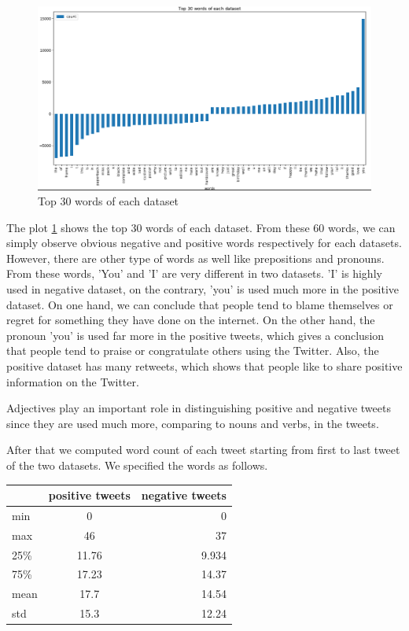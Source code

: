 \documentclass[10pt,conference,compsocconf]{IEEEtran}
\begin{document}
\begin{tiny}
	\begin{figure}[b] \label{fig4}
		\includegraphics[scale=0.35]{Lkhamaa2.png}   
		\caption{Top 30 words of each dataset }
		\label{fig4}    
	\end{figure}
\end{tiny}

The plot \ref{fig4} shows the top 30 words of each dataset. From these 60 words, we can simply observe obvious negative and positive words respectively for each datasets. However, there are other type of words as well like prepositions and pronouns. From these words, 'You' and 'I' are very different in two datasets. 'I' is highly used in negative dataset, on the contrary, 'you' is used much more in the positive dataset. On one hand, we can conclude that people tend to blame themselves or regret for something they have done on the internet. On the other hand, the pronoun 'you' is used far more in the positive tweets, which gives a conclusion that people tend to praise or congratulate others using the Twitter. Also, the positive dataset has many retweets, which shows that people like to share positive information on the Twitter.

Adjectives play an important role in distinguishing positive and negative tweets since they are used much more, comparing to nouns and verbs, in the tweets.

After that we computed word count of each tweet starting from first to last tweet of the two datasets. We specified the words as follows.

\begin{center}
	\begin{tabular}{ |l|c|r|}
		\hline
		  & positive tweets & negative tweets \\ \hline
		min & 0 & 0 \\ \hline
		max & 46 & 37 \\ \hline
		25\% & 11.76 & 9.934 \\ \hline
		75\% & 17.23 & 14.37 \\ \hline
		mean & 17.7 & 14.54 \\ \hline
		std & 15.3 & 12.24 \\ \hline
	\end{tabular}
\end{center}
\end{document}
